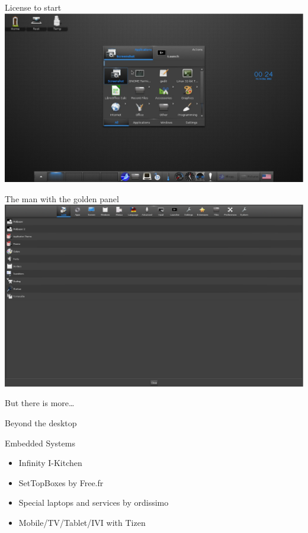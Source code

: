 \documentclass{beamer}
\begin{document}
    \begin{frame}{License to start}
        \includegraphics[width=\linewidth]{img/RunEverything.eps}
    \end{frame}

    \begin{frame}{The man with the golden panel}
        \includegraphics[width=\linewidth]{img/Settings-Panel.eps}
    \end{frame}

    \begin{frame}
        \center\huge But there is more\ldots
    \end{frame}

    \begin{frame}{Beyond the desktop}
        \begin{block}{Embedded Systems}
            \begin{itemize}
                \item Infinity I-Kitchen
                \item SetTopBoxes by Free.fr
                \item Special laptops and services by ordissimo
                \item Mobile/TV/Tablet/IVI with Tizen
            \end{itemize}
        \end{block}
    \end{frame}
\end{document}
